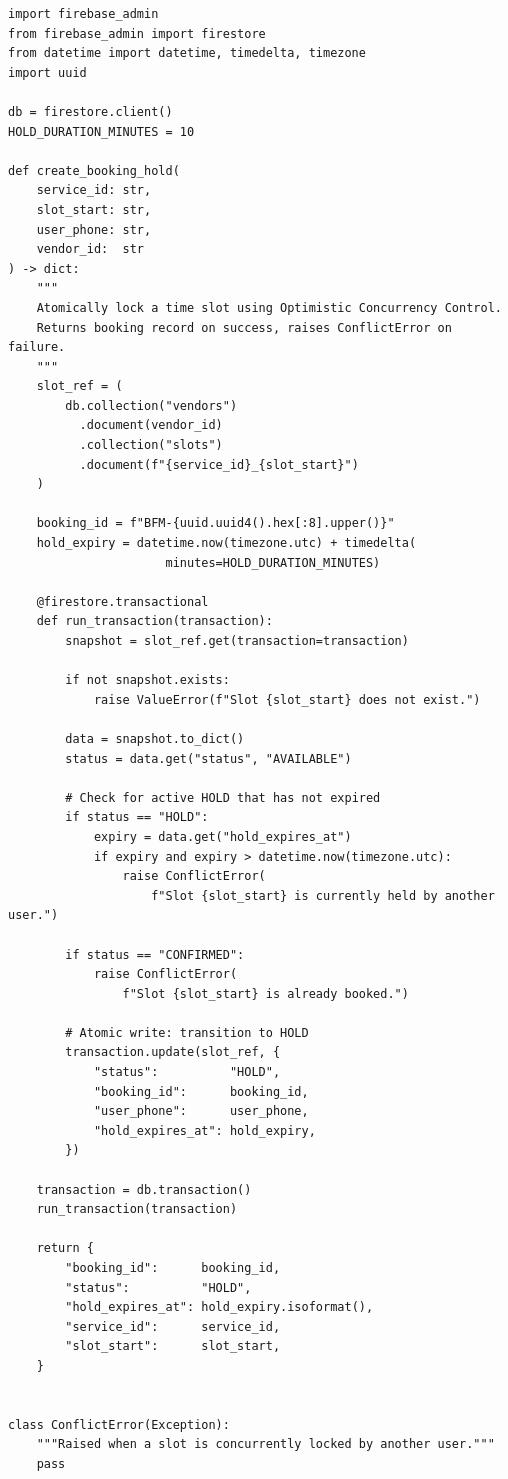 \begin{lstlisting}[style=pythonstyle, caption={OCC slot locking via Firestore transaction (agent/booking.py).}]
import firebase_admin
from firebase_admin import firestore
from datetime import datetime, timedelta, timezone
import uuid

db = firestore.client()
HOLD_DURATION_MINUTES = 10

def create_booking_hold(
    service_id: str,
    slot_start: str,
    user_phone: str,
    vendor_id:  str
) -> dict:
    """
    Atomically lock a time slot using Optimistic Concurrency Control.
    Returns booking record on success, raises ConflictError on failure.
    """
    slot_ref = (
        db.collection("vendors")
          .document(vendor_id)
          .collection("slots")
          .document(f"{service_id}_{slot_start}")
    )

    booking_id = f"BFM-{uuid.uuid4().hex[:8].upper()}"
    hold_expiry = datetime.now(timezone.utc) + timedelta(
                      minutes=HOLD_DURATION_MINUTES)

    @firestore.transactional
    def run_transaction(transaction):
        snapshot = slot_ref.get(transaction=transaction)

        if not snapshot.exists:
            raise ValueError(f"Slot {slot_start} does not exist.")

        data = snapshot.to_dict()
        status = data.get("status", "AVAILABLE")

        # Check for active HOLD that has not expired
        if status == "HOLD":
            expiry = data.get("hold_expires_at")
            if expiry and expiry > datetime.now(timezone.utc):
                raise ConflictError(
                    f"Slot {slot_start} is currently held by another user.")

        if status == "CONFIRMED":
            raise ConflictError(
                f"Slot {slot_start} is already booked.")

        # Atomic write: transition to HOLD
        transaction.update(slot_ref, {
            "status":          "HOLD",
            "booking_id":      booking_id,
            "user_phone":      user_phone,
            "hold_expires_at": hold_expiry,
        })

    transaction = db.transaction()
    run_transaction(transaction)

    return {
        "booking_id":      booking_id,
        "status":          "HOLD",
        "hold_expires_at": hold_expiry.isoformat(),
        "service_id":      service_id,
        "slot_start":      slot_start,
    }


class ConflictError(Exception):
    """Raised when a slot is concurrently locked by another user."""
    pass
\end{lstlisting}

